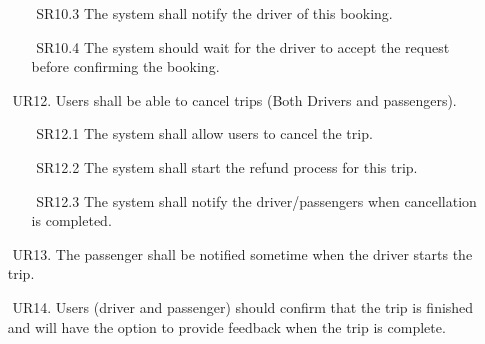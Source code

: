 \documentclass[a4paper, 12pt]{report} %
\begin{document}
\begin{itemize}
\begin{itemize}
                    \item [$ $] SR10.3 The system shall notify the driver of this booking.
                    \item [$ $] SR10.4 The system should wait for the driver to accept the request before confirming the booking.
                \end{itemize}
                \item [$ $] UR12. Users shall be able to cancel trips (Both Drivers and passengers).
                \begin{itemize}
                    \item [$ $] SR12.1 The system shall allow users to cancel the trip.
                    \item [$ $] SR12.2 The system shall start the refund process for this trip.
                    \item [$ $] SR12.3 The system shall notify the driver/passengers when cancellation is completed.
                \end{itemize}
                \item [$ $] UR13. The passenger shall be notified sometime when the driver starts the trip.
                \item [$ $] UR14. Users (driver and passenger) should confirm that the trip is finished and will have the option to provide feedback when the trip is complete.

\end{itemize}
\end{document}
